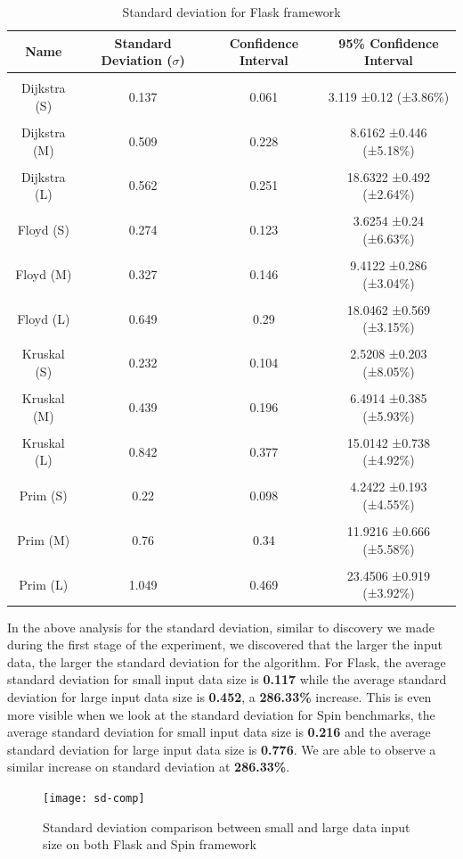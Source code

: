 \newpage
\bigskip
\begin{table}[h!]
\centering
\begin{tabular}{||c c c c||} 
\hline
Name & Standard Deviation ($\sigma$) & Confidence Interval & 95\% Confidence Interval \\ [1ex] 
\hline\hline
 & & & \\
Dijkstra (S) & 0.137 & 0.061 & 3.119 ±0.12 (±3.86\%) \\
 & & & \\
Dijkstra (M) & 0.509 & 0.228 & 8.6162 ±0.446 (±5.18\%) \\
 & & & \\
Dijkstra (L) & 0.562 & 0.251 & 18.6322 ±0.492 (±2.64\%) \\
 & & & \\
Floyd (S) & 0.274 & 0.123 & 3.6254 ±0.24 (±6.63\%) \\
 & & & \\
Floyd (M) & 0.327 & 0.146 & 9.4122 ±0.286 (±3.04\%) \\
 & & & \\
Floyd (L) & 0.649 & 0.29 & 18.0462 ±0.569 (±3.15\%) \\
 & & & \\
Kruskal (S) & 0.232 & 0.104 & 2.5208 ±0.203 (±8.05\%) \\
 & & & \\
Kruskal (M) & 0.439 & 0.196 & 6.4914 ±0.385 (±5.93\%) \\
 & & & \\
Kruskal (L) & 0.842 & 0.377 & 15.0142 ±0.738 (±4.92\%) \\
 & & & \\
Prim (S) & 0.22 & 0.098 & 4.2422 ±0.193 (±4.55\%) \\
 & & & \\
Prim (M) & 0.76 & 0.34 & 11.9216 ±0.666 (±5.58\%) \\
 & & & \\
Prim (L) & 1.049 & 0.469 & 23.4506 ±0.919 (±3.92\%) \\ [1ex]
\hline
\end{tabular}
\caption{Standard deviation for Flask framework}
\label{table:time_complexity_2}
\end{table}
\bigskip

In the above analysis for the standard deviation, similar to discovery we made during the first stage of the experiment, we discovered that the larger the input data, the larger the standard deviation for the algorithm. For Flask, the average standard deviation for small input data size is \textbf{0.117} while the average standard deviation for large input data size is \textbf{0.452}, a \textbf{286.33\%} increase. This is even more visible when we look at the standard deviation for Spin benchmarks, the average standard deviation for small input data size is \textbf{0.216} and the average standard deviation for large input data size is \textbf{0.776}. We are able to observe a similar increase on standard deviation at \textbf{286.33\%}.

\bigskip
\begin{figure}[hp]
\centering
\texttt{[image: sd-comp]}
\caption{\footnotesize{Standard deviation comparison between small and large data input size on both Flask and Spin framework}}
\captionsetup{aboveskip=0pt,font=it}
\end{figure}
\bigskip